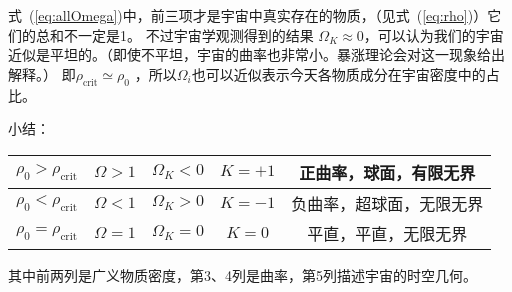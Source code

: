 \documentclass[12pt]{ctexart}
\newcommand{\refeq}[1]{式~(\ref{#1})}
\begin{document}
\refeq{eq:allOmega}中，前三项才是宇宙中真实存在的物质，（见\refeq{eq:rho}）它们的总和不一定是1。
不过宇宙学观测得到的结果 $\Omega_K \approx 0$，可以认为我们的宇宙近似是平坦的。（即使不平坦，宇宙的曲率也非常小。暴涨理论会对这一现象给出解释。） 
即$\rho_\text{crit}\simeq\rho_0$ ，所以$\Omega_i$也可以近似表示今天各物质成分在宇宙密度中的占比。

小结：
\begin{table}[H]
    \centering
    \begin{tabular}{|c|c|c|c|c|}
    \hline
    $\rho_0>\rho_\text{crit}$  & $\Omega>1$ & $\Omega_K<0$ & $K=+1$ & 正曲率，球面，有限无界 \\ \hline
    $\rho_0<\rho_\text{crit}$  & $\Omega<1$ & $\Omega_K>0$ & $K=-1$ & 负曲率，超球面，无限无界  \\ \hline
    $\rho_0=\rho_\text{crit}$  & $\Omega=1$ & $\Omega_K=0$ & $K=0$ & 平直，平直，无限无界 \\ \hline
    \end{tabular}
\end{table}

其中前两列是广义物质密度，第3、4列是曲率，第5列描述宇宙的时空几何。
\end{document}
